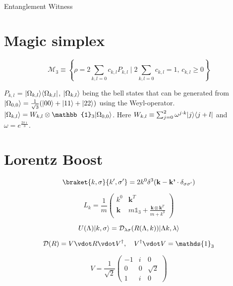 Entanglement Witness

\section{Magic simplex}

\begin{equation}
    \mathcal{M}_3 \equiv \left\{\rho = 2 \sum_{k,l=0} c_{k,l} P_{k,l} \mid 2 \sum_{k,l=0} c_{k,l} = 1, \, c_{k,l} \geq 0\right\}
\end{equation}

$P_{k,l}$ = $\lvert\Omega_{k,l}\rangle\langle\Omega_{k,l}\rvert$, $\lvert\Omega_{k,l}\rangle$ being the bell states that can be generated from $\lvert\Omega_{0,0}\rangle = \frac{1}{\sqrt{3}}(\lvert00\rangle + \lvert11\rangle + \lvert22\rangle)$ 
using the Weyl-operator. $\ket{\Omega_{k,l}} = W_{k,l} \otimes \mathbb{1}_3 \ket{\Omega_{0,0}}$. Here $W_{k,l} \equiv \sum_{j=0}^{2}\omega^{j\cdot k}\lvert j\rangle\langle j+l\rvert$ and $\omega = e^{\frac{2\pi\imath}{3}}$.

\section{Lorentz Boost}

\begin{equation}
    \braket{k,\sigma}{k',\sigma'} = 2 k^0 \delta^3(\textbf{k} - \textbf{k'} \cdot \delta_{\sigma\sigma'})
\end{equation}

\begin{equation}
    L_k = \frac{1}{m}\begin{pmatrix}
        k^0 & \textbf{k}^T \\
        \textbf{k} & m \mathds{1}_3+\frac{\textbf{k}\otimes \textbf{k}^T}{m+k^0} 
        \end{pmatrix}
\end{equation}

\begin{equation}
    U(\Lambda)\lvert k,\sigma\rangle = \mathcal{D}_{\lambda\sigma}(R(\Lambda,k))\lvert\Lambda k,\lambda\rangle
\end{equation}

\begin{equation}
    \mathcal{D}(R) = V \vdot R \vdot V^\dagger, \quad V^\dagger\vdot V = \mathds{1}_3
\end{equation}

\begin{equation}
    V = \frac{1}{\sqrt{2}}\begin{pmatrix}
        -1 & i & 0 \\
        0 & 0 & \sqrt{2} \\
        1 & i & 0 
        \end{pmatrix}
\end{equation}

